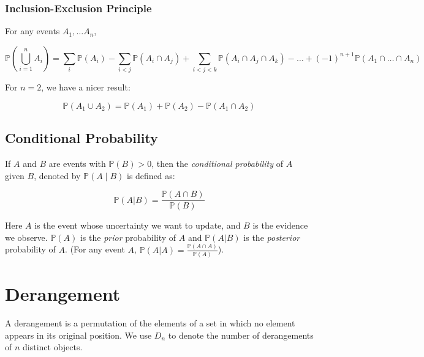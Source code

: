 \documentclass{article}
\begin{document}
\subsubsection{Inclusion-Exclusion Principle}

For any events $A_{1}, \dots A_n$, 

\begin{equation}
    \mathbb{P}\left( \bigcup_{i=1}^{n} A_i \right) = \sum_{i} \mathbb{P}(A_i) - \sum_{i<j} \mathbb{P}(A_i \cap A_j) + \sum_{i<j<k} \mathbb{P}(A_i \cap A_j \cap A_k) - \dots + (-1)^{n+1} \mathbb{P}(A_{1} \cap \dots \cap A_n)
\end{equation}

\noindent For $n=2$, we have a nicer result:

\begin{equation*}
    \mathbb{P}(A_{1} \cup A_{2}) = \mathbb{P}(A_{1}) + \mathbb{P}(A_{2}) - \mathbb{P}(A_{1} \cap A_{2})
\end{equation*}

\subsection{Conditional Probability}

\begin{definition}
    If $A$ and $B$ are events with $\mathbb{P}(B) > 0$, then the \textit{conditional probability} of $A$ given $B$, denoted by $\mathbb{P}(A \mid B)$ is defined as: 

    \begin{equation*}
        \mathbb{P}(A | B) = \frac{\mathbb{P}(A \cap B)}{\mathbb{P}(B)}
    \end{equation*}
\end{definition}

\noindent Here $A$ is the event whose uncertainty we want to update, and $B$ is the evidence we observe. $\mathbb{P}(A)$ is the \textit{prior} probability of $A$ and $\mathbb{P}(A | B)$ is the \textit{posterior} probability of $A$. (For any event $A$, $\mathbb{P}(A|A) = \frac{\mathbb{P}(A \cap A)}{\mathbb{P}(A)}$).




\section{Derangement}

A derangement is a permutation of the elements of a set in which no element appears in its original position. We use $D_n$ to denote the number of derangements of $n$ distinct objects. 
\end{document}
